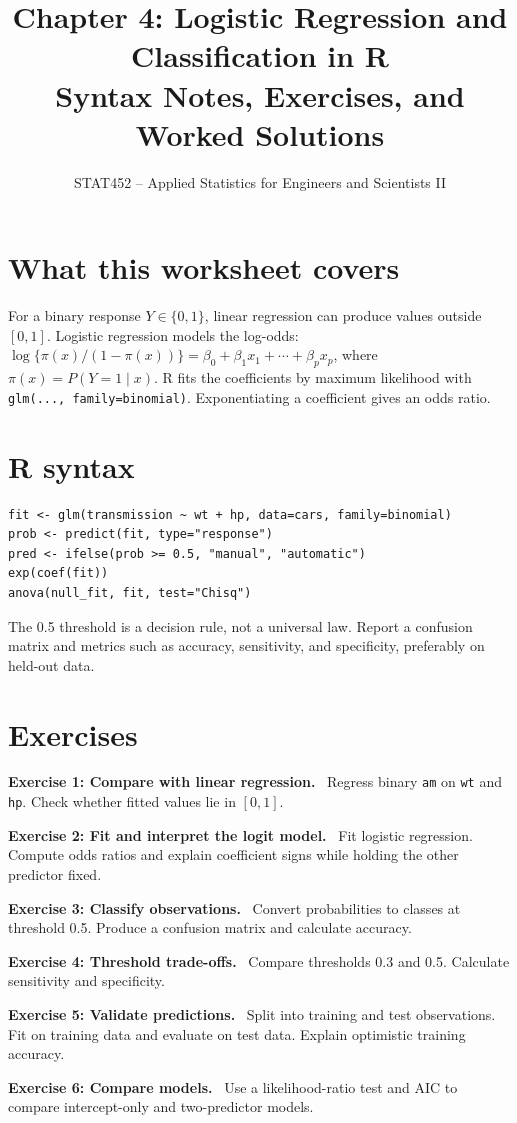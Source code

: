 \documentclass[11pt]{article}
\title{Chapter 4: Logistic Regression and Classification in R\\\large Syntax Notes, Exercises, and Worked Solutions}\author{STAT452 -- Applied Statistics for Engineers and Scientists II}\date{}
\newenvironment{exercise}[1]{\par\medskip\noindent\color{navy}\textbf{Exercise #1.}\color{black}\ }{\par\medskip}\newenvironment{answer}[1]{\par\medskip\noindent\color{green}\textbf{Solution #1.}\color{black}\ }{\hfill$\square$\par\medskip}
\begin{document}
\maketitle\tableofcontents\bigskip
\section{What this worksheet covers}
For a binary response $Y\in\{0,1\}$, linear regression can produce values outside $[0,1]$. Logistic regression models the log-odds: $\log\{\pi(x)/(1-\pi(x))\}=\beta_0+\beta_1x_1+\cdots+\beta_px_p$, where $\pi(x)=P(Y=1\mid x)$. R fits the coefficients by maximum likelihood with \texttt{glm(..., family=binomial)}. Exponentiating a coefficient gives an odds ratio.
\section{R syntax}
\begin{lstlisting}
fit <- glm(transmission ~ wt + hp, data=cars, family=binomial)
prob <- predict(fit, type="response")
pred <- ifelse(prob >= 0.5, "manual", "automatic")
exp(coef(fit))
anova(null_fit, fit, test="Chisq")
\end{lstlisting}
The 0.5 threshold is a decision rule, not a universal law. Report a confusion matrix and metrics such as accuracy, sensitivity, and specificity, preferably on held-out data.
\section{Exercises}
\begin{exercise}{1: Compare with linear regression} Regress binary \texttt{am} on \texttt{wt} and \texttt{hp}. Check whether fitted values lie in $[0,1]$.\end{exercise}
\begin{exercise}{2: Fit and interpret the logit model} Fit logistic regression. Compute odds ratios and explain coefficient signs while holding the other predictor fixed.\end{exercise}
\begin{exercise}{3: Classify observations} Convert probabilities to classes at threshold 0.5. Produce a confusion matrix and calculate accuracy.\end{exercise}
\begin{exercise}{4: Threshold trade-offs} Compare thresholds 0.3 and 0.5. Calculate sensitivity and specificity.\end{exercise}
\begin{exercise}{5: Validate predictions} Split into training and test observations. Fit on training data and evaluate on test data. Explain optimistic training accuracy.\end{exercise}
\begin{exercise}{6: Compare models} Use a likelihood-ratio test and AIC to compare intercept-only and two-predictor models.\end{exercise}
\end{document}
